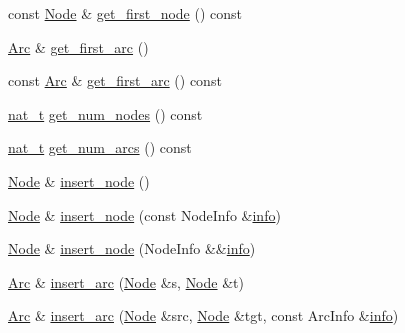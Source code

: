 \begin{DoxyCompactItemize}
const \hyperlink{class_designar_1_1_digraph_a4dc921c41a480b7946a04170e997d8ae}{Node} \& \hyperlink{class_designar_1_1_digraph_ada5266ac3e2ed091a37c434dd7484bb9}{get\+\_\+first\+\_\+node} () const
\item 
\hyperlink{class_designar_1_1_digraph_a0ceb278671f2a535c00fddccdeafd69f}{Arc} \& \hyperlink{class_designar_1_1_digraph_af28c0708f3a09f172e4258772f56a476}{get\+\_\+first\+\_\+arc} ()
\item 
const \hyperlink{class_designar_1_1_digraph_a0ceb278671f2a535c00fddccdeafd69f}{Arc} \& \hyperlink{class_designar_1_1_digraph_a7842484a51df899e95a65e979d70079c}{get\+\_\+first\+\_\+arc} () const
\item 
\hyperlink{namespace_designar_aa72662848b9f4815e7bf31a7cf3e33d1}{nat\+\_\+t} \hyperlink{class_designar_1_1_digraph_a7e2f0b56ec85cfd63ff757bef58ae702}{get\+\_\+num\+\_\+nodes} () const
\item 
\hyperlink{namespace_designar_aa72662848b9f4815e7bf31a7cf3e33d1}{nat\+\_\+t} \hyperlink{class_designar_1_1_digraph_aa6289acc079b48c3ebaead44a974d716}{get\+\_\+num\+\_\+arcs} () const
\item 
\hyperlink{class_designar_1_1_digraph_a4dc921c41a480b7946a04170e997d8ae}{Node} \& \hyperlink{class_designar_1_1_digraph_a6ee69792c537ce241a2e448da1b46f1b}{insert\+\_\+node} ()
\item 
\hyperlink{class_designar_1_1_digraph_a4dc921c41a480b7946a04170e997d8ae}{Node} \& \hyperlink{class_designar_1_1_digraph_a292dae36c1ee1fa581013c908ecebd1c}{insert\+\_\+node} (const Node\+Info \&\hyperlink{class_designar_1_1_digraph_aec655bb1b26775cb7ad3581240290efe}{info})
\item 
\hyperlink{class_designar_1_1_digraph_a4dc921c41a480b7946a04170e997d8ae}{Node} \& \hyperlink{class_designar_1_1_digraph_a6b099922c3891b2c9fce75ffeedba025}{insert\+\_\+node} (Node\+Info \&\&\hyperlink{class_designar_1_1_digraph_aec655bb1b26775cb7ad3581240290efe}{info})
\item 
\hyperlink{class_designar_1_1_digraph_a0ceb278671f2a535c00fddccdeafd69f}{Arc} \& \hyperlink{class_designar_1_1_digraph_a52b127c0102e207125c6f4eaaeb7ab26}{insert\+\_\+arc} (\hyperlink{class_designar_1_1_digraph_a4dc921c41a480b7946a04170e997d8ae}{Node} \&s, \hyperlink{class_designar_1_1_digraph_a4dc921c41a480b7946a04170e997d8ae}{Node} \&t)
\item 
\hyperlink{class_designar_1_1_digraph_a0ceb278671f2a535c00fddccdeafd69f}{Arc} \& \hyperlink{class_designar_1_1_digraph_a58d7f0e13a9e42cbc9e28683b527ca72}{insert\+\_\+arc} (\hyperlink{class_designar_1_1_digraph_a4dc921c41a480b7946a04170e997d8ae}{Node} \&src, \hyperlink{class_designar_1_1_digraph_a4dc921c41a480b7946a04170e997d8ae}{Node} \&tgt, const Arc\+Info \&\hyperlink{class_designar_1_1_digraph_aec655bb1b26775cb7ad3581240290efe}{info})

\end{DoxyCompactItemize}
